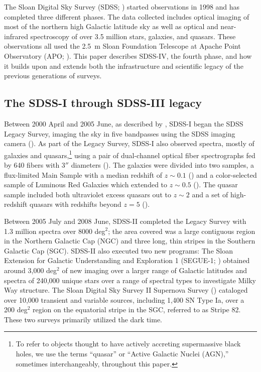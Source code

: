 The Sloan Digital Sky Survey (SDSS; \citealt{york00a}) started
observations in 1998 and has completed three different phases. The
data collected includes optical imaging of most of the northern high
Galactic latitude sky as well as optical and near-infrared
spectroscopy of over 3.5 million stars, galaxies, and quasars. These
observations all used the 2.5~m Sloan Foundation Telescope at
Apache Point Observatory (APO;
\citealt{gunn06a}). This paper describes SDSS-IV, the fourth phase,
and how it builds upon and extends both the infrastructure and
scientific legacy of the previous generations of surveys.

\subsection{The SDSS-I through SDSS-III legacy}

Between 2000 April and 2005 June, as described by \citet{york00a},
SDSS-I began the SDSS Legacy Survey, imaging the sky in five
bandpasses \citep[$u$, $g$, $r$, $i$ and $z$;][]{fukugita96a} using
the SDSS imaging camera (\citealt{gunn98a}). As part of the Legacy
Survey, SDSS-I also observed spectra, mostly of galaxies and
quasars,\footnote{To refer to objects thought to have actively
accreting supermassive black holes, we use the terms ``quasar'' or
``Active Galactic Nuclei (AGN),'' sometimes interchangeably,
throughout this paper.}  using a pair of dual-channel optical fiber
spectrographs fed by 640 fibers with 3$''$ diameters
(\citealt{smee13a}). The galaxies were divided into two samples, a
flux-limited Main Sample with a median redshift of $z\sim 0.1$
(\citealt{strauss02a}) and a color-selected sample of Luminous Red
Galaxies which extended to $z\sim 0.5$ (\citealt{eisenstein01a}). The
quasar sample included both ultraviolet excess quasars out to $z\sim
2$ and a set of high-redshift quasars with redshifts beyond $z=5$
(\citealt{richards02a}).

Between 2005 July and 2008 June, SDSS-II completed the Legacy Survey
with 1.3 million spectra over 8000 deg$^2$; the area covered was a
large contiguous region in the Northern Galactic Cap (NGC) and three
long, thin stripes in the Southern Galactic Cap (SGC). SDSS-II also
executed two new programs: The Sloan Extension for Galactic
Understanding and Exploration 1 (\mbox{SEGUE-1;} \citealt{yanny09a}) obtained
around 3,000 deg$^2$ of new imaging over a larger range of Galactic
latitudes and spectra of 240,000 unique stars over a range of spectral
types to investigate Milky Way structure. The Sloan Digital Sky Survey
II Supernova Survey (\citealt{frieman08b, sako14a}) cataloged over
10,000 transient and variable sources, including 1,400 SN Type Ia,
over a 200 deg$^2$ region on the equatorial stripe in the SGC,
referred to as Stripe 82. These two surveys primarily utilized the
dark time.

